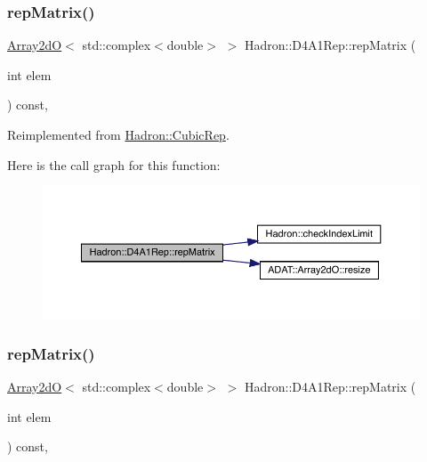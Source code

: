 \subsubsection{\texorpdfstring{repMatrix()}{repMatrix()}\hspace{0.1cm}{\footnotesize\ttfamily [1/2]}}
{\footnotesize\ttfamily \mbox{\hyperlink{classADAT_1_1Array2dO}{Array2dO}}$<$ std\+::complex$<$double$>$ $>$ Hadron\+::\+D4\+A1\+Rep\+::rep\+Matrix (\begin{DoxyParamCaption}\item[{int}]{elem }\end{DoxyParamCaption}) const\hspace{0.3cm}{\ttfamily [inline]}, {\ttfamily [virtual]}}



Reimplemented from \mbox{\hyperlink{structHadron_1_1CubicRep_ac5d7e9e6f4ab1158b5fce3e4ad9e8005}{Hadron\+::\+Cubic\+Rep}}.

Here is the call graph for this function\+:
\nopagebreak
\begin{figure}[H]
\begin{center}
\leavevmode
\includegraphics[width=350pt]{d8/d02/structHadron_1_1D4A1Rep_a4dca745781630db08cee88f37cae21b6_cgraph}
\end{center}
\end{figure}
\mbox{\label{structHadron_1_1D4A1Rep_a4dca745781630db08cee88f37cae21b6}} 
\subsubsection{\texorpdfstring{repMatrix()}{repMatrix()}\hspace{0.1cm}{\footnotesize\ttfamily [2/2]}}
{\footnotesize\ttfamily \mbox{\hyperlink{classADAT_1_1Array2dO}{Array2dO}}$<$ std\+::complex$<$double$>$ $>$ Hadron\+::\+D4\+A1\+Rep\+::rep\+Matrix (\begin{DoxyParamCaption}\item[{int}]{elem }\end{DoxyParamCaption}) const\hspace{0.3cm}{\ttfamily [inline]}, {\ttfamily [virtual]}}



